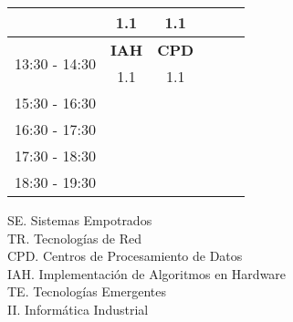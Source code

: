 \documentclass[10pt,spanish, landscape]{article}
\begin{document}
\begin{minipage}{0.7\textwidth}
\begin{tabular}{|c|c|c|c|c|c|}
& \multicolumn{1}{|c|}{ \cellcolor{grisclaro} {\footnotesize 1.1}}& \multicolumn{1}{|c|}{ \cellcolor{grisclaro} {\footnotesize 1.1}} &  &  & \\ 
 \hline
\multirow{2}{*}{13:30 - 14:30} & \multicolumn{1}{|c|}{ \cellcolor{grisclaro} \textbf{IAH}}& \multicolumn{1}{|c|}{ \cellcolor{grisclaro} \textbf{CPD}} &  &  & \\ 
& \multicolumn{1}{|c|}{ \cellcolor{grisclaro} {\footnotesize 1.1}}& \multicolumn{1}{|c|}{ \cellcolor{grisclaro} {\footnotesize 1.1}} &  &  & \\ 
 \hline
\multirow{2}{*}{15:30 - 16:30}  &  &  &  &  & \\ 
 &  &  &  &  & \\ 
 \hline
\multirow{2}{*}{16:30 - 17:30}  &  &  &  &  & \\ 
 &  &  &  &  & \\ 
 \hline
\multirow{2}{*}{17:30 - 18:30}  &  &  &  &  & \\ 
 &  &  &  &  & \\ 
 \hline
\multirow{2}{*}{18:30 - 19:30}  &  &  &  &  & \\ 
 &  &  &  &  & \\ 
 \hline

\end{tabular}
\end{minipage}
\begin{minipage}{0.25\textwidth}
SE. Sistemas Empotrados\\[0.5cm]
TR. Tecnologías de Red\\[0.5cm]
CPD. Centros de Procesamiento de Datos\\[0.5cm]
IAH. Implementación de Algoritmos en Hardware\\[0.5cm]
TE. Tecnologías Emergentes\\[0.5cm]
II. Informática Industrial\\[0.5cm]
\end{minipage}
\newpage
\end{document}
